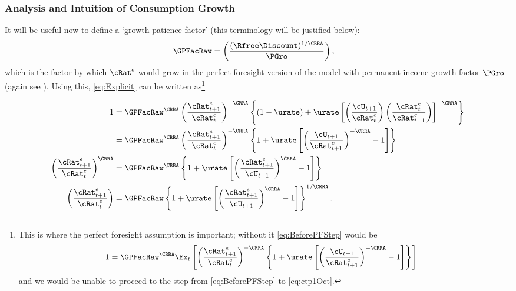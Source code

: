 \documentclass{handout}
\begin{document}
\subsubsection{Analysis and Intuition of Consumption Growth}
It will be useful now to define a `growth patience factor' (this terminology will be justified below):
\begin{equation}\begin{gathered}\begin{aligned}
  \GPFacRaw & =  \left(\frac{(\Rfree\Discount)^{1/\CRRA}}{\PGro}\right), \label{eq:GPFacRaw}
\end{aligned}\end{gathered}\end{equation}
which is the factor by which ${\cRat}^{e}$ would grow in the
perfect foresight version of the model with permanent income growth factor
$\PGro$ (again see ).  
Using this,
\eqref{eq:Explicit} can be written as\footnote{This is where the perfect foresight assumption is important; without it \eqref{eq:BeforePFStep} would be 
\begin{equation}\begin{gathered}\begin{aligned}
 1       & =  \GPFacRaw^{\CRRA} \Ex_{t}\left[\left(\frac{{\cRat}^{e}_{t+1}}{{\cRat}^{e}_{t}}\right)^{-\CRRA} \left\{1+\urate\left[\left(\frac{\cU_{t+1}}{{\cRat}^{e}_{t+1}}\right)^{-\CRRA}-1\right]\right\}\right] \label{eq:BeforePFStepWithEx}
\end{aligned}\end{gathered}\end{equation}
and we would be unable to proceed to the step from \eqref{eq:BeforePFStep} to \eqref{eq:ctp1Oct}.}

\begin{equation}\begin{gathered}\begin{aligned}
        1  & = \GPFacRaw^{\CRRA} \left(\frac{{\cRat}^{e}_{t+1}}{{\cRat}^{e}_{t}}\right)^{-\CRRA} \left\{(1-\urate)+\urate\left[\left(\frac{\cU_{t+1}}{{\cRat}^{e}_{t}}\right)\left(\frac{{\cRat}^{e}_{t}}{{\cRat}^{e}_{t+1}}\right)\right]^{-\CRRA}\right\}
\\       & = \GPFacRaw^{\CRRA} \left(\frac{{\cRat}^{e}_{t+1}}{{\cRat}^{e}_{t}}\right)^{-\CRRA} \left\{1+\urate\left[\left(\frac{\cU_{t+1}}{{\cRat}^{e}_{t+1}}\right)^{-\CRRA}-1\right]\right\} \label{eq:BeforePFStep}
\\       \left(\frac{{\cRat}^{e}_{t+1}}{{\cRat}^{e}_{t}}\right)^{\CRRA} & = \GPFacRaw^{\CRRA} \left\{1+\urate\left[\left(\frac{{\cRat}^{e}_{t+1}}{\cU_{t+1}}\right)^{\CRRA}-1\right]\right\} \label{eq:ctp1Oct}
\\       \left(\frac{{\cRat}^{e}_{t+1}}{{\cRat}^{e}_{t}}\right) & = {\GPFacRaw} \left\{1+\urate\left[\left(\frac{{\cRat}^{e}_{t+1}}{\cU_{t+1}}\right)^{\CRRA}-1\right]\right\}^{1/\CRRA}. \label{eq:cedel}
\end{aligned}\end{gathered}\end{equation}
\end{document}
